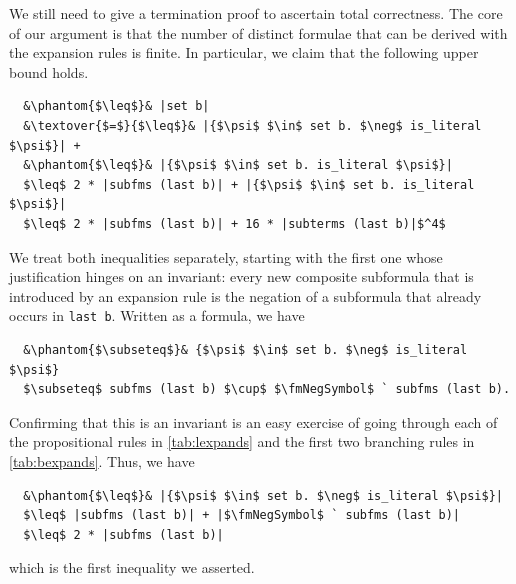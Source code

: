 \documentclass[runningheads]{llncs}
\newcommand{\textover}[3][l]{%
 \makebox[\widthof{#3}][#1]{#2}%
}
\newcommand{\fmNegSymbol}{\boldsymbol{\neg}}
\begin{document}
We still need to give a termination proof to ascertain total correctness.
The core of our argument is that the number of distinct formulae that can be derived with the expansion rules is finite.
In particular, we claim that the following upper bound holds.
\begin{lstlisting}
  &\phantom{$\leq$}& |set b|
  &\textover{$=$}{$\leq$}& |{$\psi$ $\in$ set b. $\neg$ is_literal $\psi$}| +
  &\phantom{$\leq$}& |{$\psi$ $\in$ set b. is_literal $\psi$}|
  $\leq$ 2 * |subfms (last b)| + |{$\psi$ $\in$ set b. is_literal $\psi$}|
  $\leq$ 2 * |subfms (last b)| + 16 * |subterms (last b)|$^4$
\end{lstlisting}
We treat both inequalities separately, starting with the first one whose justification hinges on an invariant: 
every new composite subformula that is introduced by an expansion rule is the negation of a subformula that already occurs in \lstinline!last b!.
Written as a formula, we have
\begin{lstlisting}
  &\phantom{$\subseteq$}& {$\psi$ $\in$ set b. $\neg$ is_literal $\psi$}
  $\subseteq$ subfms (last b) $\cup$ $\fmNegSymbol$ ` subfms (last b).
\end{lstlisting}
Confirming that this is an invariant is an easy exercise of going through each of the propositional rules in \cref{tab:lexpands} and the first two branching rules in \cref{tab:bexpands}.
Thus, we have
\begin{lstlisting}
  &\phantom{$\leq$}& |{$\psi$ $\in$ set b. $\neg$ is_literal $\psi$}|
  $\leq$ |subfms (last b)| + |$\fmNegSymbol$ ` subfms (last b)|
  $\leq$ 2 * |subfms (last b)|
\end{lstlisting}
which is the first inequality we asserted. 
\end{document}
